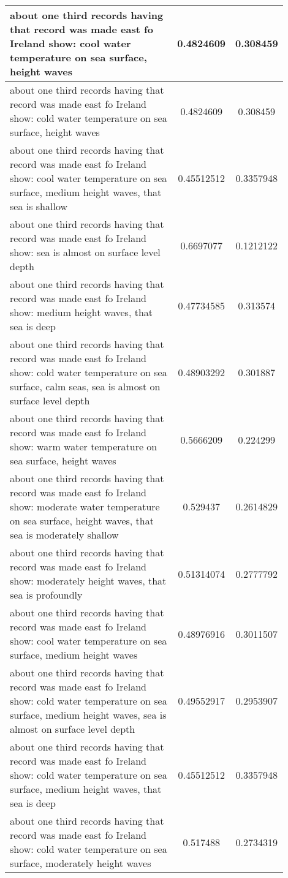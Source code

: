 \documentclass{article}
\begin{document}
\begin{longtable}{|p{0.9\linewidth}|c|c|}
about one third records having that record was made east fo Ireland show: cool water temperature on sea surface, height waves & 0.4824609 & 0.308459 \\ \hline
about one third records having that record was made east fo Ireland show: cold water temperature on sea surface, height waves & 0.4824609 & 0.308459 \\ \hline
about one third records having that record was made east fo Ireland show: cool water temperature on sea surface, medium height waves, that sea is shallow & 0.45512512 & 0.3357948 \\ \hline
about one third records having that record was made east fo Ireland show: sea is almost on surface level depth & 0.6697077 & 0.1212122 \\ \hline
about one third records having that record was made east fo Ireland show: medium height waves, that sea is deep & 0.47734585 & 0.313574 \\ \hline
about one third records having that record was made east fo Ireland show: cold water temperature on sea surface, calm seas, sea is almost on surface level depth & 0.48903292 & 0.301887 \\ \hline
about one third records having that record was made east fo Ireland show: warm water temperature on sea surface, height waves & 0.5666209 & 0.224299 \\ \hline
about one third records having that record was made east fo Ireland show: moderate water temperature on sea surface, height waves, that sea is moderately shallow & 0.529437 & 0.2614829 \\ \hline
about one third records having that record was made east fo Ireland show: moderately height waves, that sea is profoundly & 0.51314074 & 0.2777792 \\ \hline
about one third records having that record was made east fo Ireland show: cool water temperature on sea surface, medium height waves & 0.48976916 & 0.3011507 \\ \hline
about one third records having that record was made east fo Ireland show: cold water temperature on sea surface, medium height waves, sea is almost on surface level depth & 0.49552917 & 0.2953907 \\ \hline
about one third records having that record was made east fo Ireland show: cold water temperature on sea surface, medium height waves, that sea is deep & 0.45512512 & 0.3357948 \\ \hline
about one third records having that record was made east fo Ireland show: cold water temperature on sea surface, moderately height waves & 0.517488 & 0.2734319 \\ \hline

\end{longtable}
\end{document}
